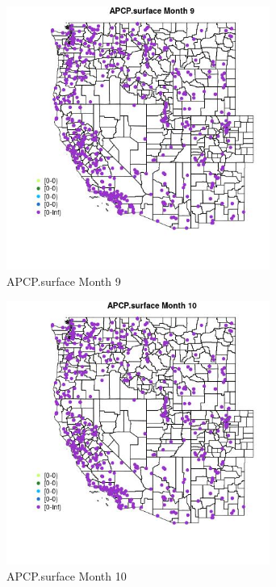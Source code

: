\begin{figure} 
\centering  
\includegraphics[width=0.77\textwidth]{Code_Outputs/Report_ML_input_PM25_Step4_part_e_de_duplicated_aves_compiled_2019-05-14wNAs_MapObsMo9APCPsurface.jpg} 
\caption{\label{fig:Report_ML_input_PM25_Step4_part_e_de_duplicated_aves_compiled_2019-05-14wNAsMapObsMo9APCPsurface}APCP.surface Month 9} 
\end{figure} 
 

\clearpage 

\begin{figure} 
\centering  
\includegraphics[width=0.77\textwidth]{Code_Outputs/Report_ML_input_PM25_Step4_part_e_de_duplicated_aves_compiled_2019-05-14wNAs_MapObsMo10APCPsurface.jpg} 
\caption{\label{fig:Report_ML_input_PM25_Step4_part_e_de_duplicated_aves_compiled_2019-05-14wNAsMapObsMo10APCPsurface}APCP.surface Month 10} 
\end{figure} 
 

